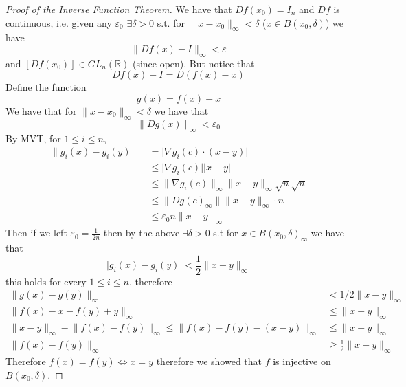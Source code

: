 \documentclass[11pt,a4paper]{article}
\theoremstyle{definition}
\theoremstyle{plain}
\theoremstyle{remark}
\newcommand{\R}{\mathbb{R}}
\newcommand{\abs}[1]{\lvert #1 \rvert}
\newcommand{\norm}[1]{\lVert #1 \rVert}
\begin{document}
\begin{proof}[Proof of the Inverse Function Theorem]
    We have that $Df(x_0) = I_n$ and $Df$ is continuous, i.e. given any $\varepsilon_0$ $\exists \delta > 0$ 
    s.t. for $\norm{x-x_0}_{\infty} < \delta$ ($x \in B(x_0, \delta)$) we have 
    $$\norm{Df(x) - I}_\infty < \varepsilon$$
    and $[Df(x_0)] \in GL_n(\R)$ (since open). But notice that 
    $$Df(x) - I = D(f(x) - x)$$
    Define the function 
    $$g(x) = f(x) - x$$
    We have that for $\norm{x-x_0}_{\infty} < \delta$ we have that 
    $$\norm{Dg(x)}_\infty < \varepsilon_0$$
    By MVT, for $1 \le i \le n$, 
    \begin{align*}
        \norm{g_i(x) - g_i(y)} &= \abs{\nabla g_i(c) \cdot (x-y)} \\
        &\le \abs{\nabla g_i(c)} \abs{x-y} \\
        &\le \norm{\nabla g_i(c)}_\infty \norm{x-y}_\infty \sqrt{n} \sqrt{n} \\
        &\le \norm{Dg(c)_\infty} \norm{x-y}_\infty \cdot n \\
        &\le \varepsilon_0 n \norm{x-y}_\infty
    \end{align*}
    Then if we left $\varepsilon_0 = \frac{1}{2n}$ then by the above $\exists \delta > 0$ s.t for $x \in B(x_0, \delta)_\infty$ we have that 
    $$\abs{g_i(x)-g_i(y)} < \frac{1}{2} \norm{x-y}_\infty$$
    this holds for every $1 \le i \le n$, therefore 
    \begin{align*}
        \norm{g(x) - g(y)}_\infty &< 1/2 \norm{x-y}_\infty \\
        \norm{f(x) - x - f(y) + y}_\infty &\le \norm{x-y}_\infty \\
        \norm{x-y}_\infty - \norm{f(x)-f(y)}_\infty \le \norm{f(x) - f(y) - (x-y)}_\infty &\le \norm{x-y}_\infty \\
        \norm{f(x)-f(y)}_\infty &\ge \frac{1}{2} \norm{x-y}_\infty
    \end{align*}
    Therefore $f(x) = f(y) \iff x = y$ therefore we showed that $f$ is injective on $B(x_0, \delta)$. 
    

\end{proof}
\end{document}

